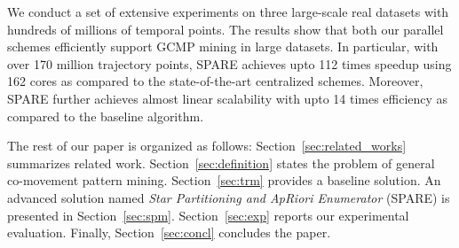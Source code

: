 We conduct a set of extensive experiments on three large-scale real datasets with hundreds of millions of
temporal points. 
The results show that both our parallel schemes efficiently support GCMP mining in large datasets.
In particular, with over 170 million trajectory points,
SPARE achieves upto 112 times speedup using 162 cores as compared to the state-of-the-art centralized schemes.
Moreover, SPARE further achieves almost linear scalability with upto 14 times efficiency
as compared to the baseline algorithm.


The rest of our paper is organized as follows: Section~\ref{sec:related_works} summarizes related work. Section~\ref{sec:definition} states the problem of general co-movement pattern mining. Section~\ref{sec:trm} provides a baseline 
solution. %
An advanced solution named
\emph{Star Partitioning and ApRiori Enumerator} (SPARE) is presented in Section~\ref{sec:spm}. Section~\ref{sec:exp} reports our experimental evaluation.
Finally, Section~\ref{sec:concl} concludes the paper.